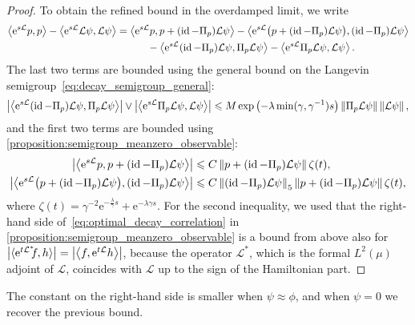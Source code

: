 \documentclass[11pt,a4paper]{article}
\DeclareMathOperator{\id}{id}
\newcommand{\e}{\mathrm{e}}
\theoremstyle{plain}
\numberwithin{equation}{section}
\renewcommand{\leq}{\leqslant}
\begin{document}
\begin{proof}
To obtain the refined bound in the overdamped limit,
we write
\begin{align*}
    \ip{\e^{s \mathcal L}p}{p} - \ip{\e^{s \mathcal L} \mathcal L \psi}{\mathcal L \psi}
      &= \ip{\e^{s \mathcal L} p}{p + (\id - \Pi_p) \mathcal L \psi}
    - \ip{\e^{s \mathcal L} \bigl(p + (\id - \Pi_p) \mathcal L \psi\bigr)}{(\id - \Pi_p) \mathcal L \psi} \\
    &\qquad \quad - \ip{\e^{s \mathcal L} (\id - \Pi_p) \mathcal L \psi}{\Pi_p \mathcal L \psi}
    - \ip{\e^{s \mathcal L} \Pi_p \mathcal L \psi}{\mathcal L \psi}.
\end{align*}
The last two terms are bounded using the general bound on the Langevin semigroup~\eqref{eq:decay_semigroup_general}:
\[
    \abs{\ip{\e^{s \mathcal L} (\id - \Pi_p) \mathcal L \psi}{\Pi_p \mathcal L \psi}}
    \vee \abs{\ip{\e^{s \mathcal L} \Pi_p \mathcal L \psi}{\mathcal L \psi}}
    \leq M \exp \left( - \lambda \min(\gamma, \gamma^{-1}) s\right) \norm{\Pi_p \mathcal L \psi} \norm{\mathcal L \psi},
\]
and the first two terms are bounded using \cref{proposition:semigroup_meanzero_observable}:
\begin{align*}
    \abs{\ip{\e^{s \mathcal L} p}{p + (\id - \Pi_p) \mathcal L \psi}}
    &\leq C \norm{p + (\id - \Pi_p) \mathcal L \psi} \zeta(t), \\
    \abs{\ip{\e^{s \mathcal L} \bigl(p + (\id - \Pi_p) \mathcal L \psi\bigr)}{(\id - \Pi_p) \mathcal L \psi}}
    &\leq C \norm{(\id - \Pi_p) \mathcal L \psi}[5] \norm{p + (\id - \Pi_p) \mathcal L \psi} \zeta(t),
\end{align*}
where $\zeta(t) = \gamma^{-2} \e^{- \frac{\lambda}{\gamma}s } + \e^{- \lambda \gamma s}$.
For the second inequality,
we used that the right-hand side of~\eqref{eq:optimal_decay_correlation} in \cref{proposition:semigroup_meanzero_observable} is a bound from above also for $\abs{\ip*{\e^{t \mathcal L^*}\!\! f}{h}} = \abs{\ip{f}{\e^{t \mathcal L}h}}$,
because the operator $\mathcal L^*$,
which is the formal $L^2(\mu)$ adjoint of $\mathcal L$,
coincides with $\mathcal L$ up to the sign of the Hamiltonian part.
\end{proof}

The constant on the right-hand side is smaller when $\psi \approx \phi$,
and when $\psi = 0$ we recover the previous bound.
\end{document}
